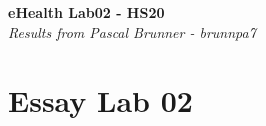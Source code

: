 \documentclass{report}
\newenvironment{Figure}
	{\par\medskip\noindent\minipage{\linewidth}}
	{\endminipage\par\medskip}
\begin{document}
\begin{titlepage}
   \begin{center}
      \Large\textbf{eHealth Lab02 - HS20}\\
      \large\textit{Results from Pascal Brunner - brunnpa7}
   \end{center}
\end{titlepage}


\section*{Essay Lab 02}
\end{document}
